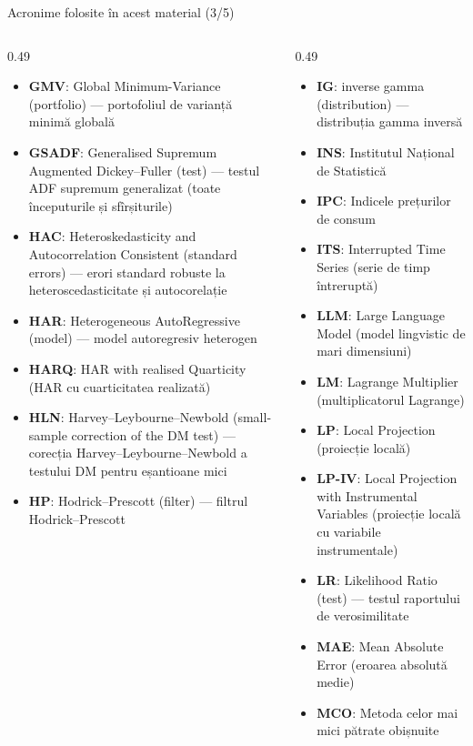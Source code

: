 \begin{frame}{Acronime folosite în acest material (3/5)}
\begin{columns}[T]
\begin{column}{0.49\textwidth}
\begin{itemize}\setlength{\itemsep}{0pt}
    \item \textbf{GMV}: Global Minimum-Variance (portfolio) — portofoliul de varianță minimă globală
    \item \textbf{GSADF}: Generalised Supremum Augmented Dickey–Fuller (test) — testul ADF supremum generalizat (toate începuturile și sfîrșiturile)
    \item \textbf{HAC}: Heteroskedasticity and Autocorrelation Consistent (standard errors) — erori standard robuste la heteroscedasticitate și autocorelație
    \item \textbf{HAR}: Heterogeneous AutoRegressive (model) — model autoregresiv heterogen
    \item \textbf{HARQ}: HAR with realised Quarticity (HAR cu cuarticitatea realizată)
    \item \textbf{HLN}: Harvey–Leybourne–Newbold (small-sample correction of the DM test) — corecția Harvey–Leybourne–Newbold a testului DM pentru eșantioane mici
    \item \textbf{HP}: Hodrick–Prescott (filter) — filtrul Hodrick–Prescott
\end{itemize}
\end{column}
\begin{column}{0.49\textwidth}
\begin{itemize}\setlength{\itemsep}{0pt}
    \item \textbf{IG}: inverse gamma (distribution) — distribuția gamma inversă
    \item \textbf{INS}: Institutul Național de Statistică
    \item \textbf{IPC}: Indicele prețurilor de consum
    \item \textbf{ITS}: Interrupted Time Series (serie de timp întreruptă)
    \item \textbf{LLM}: Large Language Model (model lingvistic de mari dimensiuni)
    \item \textbf{LM}: Lagrange Multiplier (multiplicatorul Lagrange)
    \item \textbf{LP}: Local Projection (proiecție locală)
    \item \textbf{LP-IV}: Local Projection with Instrumental Variables (proiecție locală cu variabile instrumentale)
    \item \textbf{LR}: Likelihood Ratio (test) — testul raportului de verosimilitate
    \item \textbf{MAE}: Mean Absolute Error (eroarea absolută medie)
    \item \textbf{MCO}: Metoda celor mai mici pătrate obișnuite
\end{itemize}
\end{column}
\end{columns}
\end{frame}
